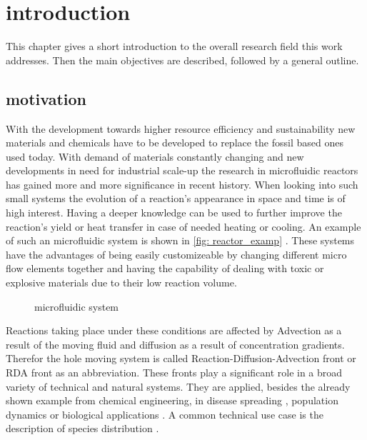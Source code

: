 \documentclass[../thesis.tex]{subfiles}
\begin{document}
\chapter{introduction}
\label{chp:introduction}

This chapter gives a short introduction to the overall research field this work addresses. Then the main objectives are described, followed by a general outline. 

\section{motivation}


With the development towards higher resource efficiency and sustainability new materials and chemicals have to be developed to replace the fossil based ones used today. With demand of materials constantly changing and new developments in need for industrial scale-up the research in microfluidic reactors has gained more and more significance in recent history. When looking into such small systems the evolution of a reaction's appearance in space and time is of high interest. Having a deeper knowledge can be used to further improve the reaction's yield or heat transfer in case of needed heating or cooling. An example of such an microfluidic system is shown in \autoref{fig: reactor_examp} \cite{corning}. These systems have the advantages of being easily customizeable by changing different micro flow elements together and having the capability of dealing with toxic or explosive materials due to their low reaction volume. 
\begin{figure}[htb]
	\centering
	\qquad
	\caption{microfluidic system}%
	\label{fig: reactor_examp}%
\end{figure}
Reactions taking place under these conditions are affected by Advection as a result of the moving fluid and diffusion as a result of concentration gradients. Therefor the hole moving system is called Reaction-Diffusion-Advection front or RDA front as an abbreviation.
These fronts play a significant role in a broad variety of technical and natural systems. They are applied, besides the already shown example from chemical engineering, in disease spreading \cite{kuto2017concentration}, population dynamics \cite{chen2018hopf, wang2019persistence} or biological applications \cite{zhao2011operator}. A common technical use case is the description of species distribution \cite{nakagaki1999reaction, von2013measurement}.
\end{document}
